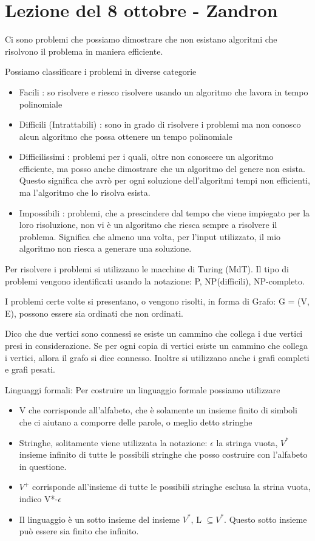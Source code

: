 \section{Lezione del 8 ottobre - Zandron}


Ci sono problemi che possiamo dimostrare che non esistano algoritmi che risolvono il problema in maniera efficiente. 

Possiamo classificare i problemi in diverse categorie
\begin{itemize}
    \item Facili : so risolvere e riesco risolvere usando un algoritmo che lavora in tempo polinomiale
    \item Difficili (Intrattabili) : sono in grado di risolvere i problemi ma non conosco alcun algoritmo che possa ottenere un tempo polinomiale
    \item Difficilissimi : problemi per i quali, oltre non conoscere un algoritmo efficiente, ma posso anche dimostrare che un algoritmo del genere non esista. Questo significa che avrò per ogni soluzione dell'algoritmi tempi non efficienti, ma l'algoritmo che lo risolva esista.
    \item Impossibili : problemi, che a prescindere dal tempo che viene impiegato per la loro risoluzione, non vi è un algoritmo che riesca sempre a risolvere il problema. Significa che almeno una volta, per l'input utilizzato, il mio algoritmo non riesca a generare una soluzione.
\end{itemize}

Per risolvere i problemi si utilizzano le macchine di Turing (MdT). Il tipo di problemi vengono identificati usando la notazione: P, NP(difficili), NP-completo.

I problemi certe volte si presentano, o vengono risolti, in forma di Grafo: G = (V, E), possono essere sia ordinati che non ordinati.

Dico che due vertici sono connessi se esiste un cammino che collega i due vertici presi in considerazione. Se per ogni copia di vertici esiste un cammino che collega i vertici, allora il grafo si dice connesso. Inoltre si utilizzano anche i grafi completi e grafi pesati.

Linguaggi formali: Per costruire un linguaggio formale possiamo utilizzare 
\begin{itemize}
    \item V che corrisponde all'alfabeto, che è solamente un insieme finito di simboli che ci aiutano a comporre delle parole, o meglio detto stringhe
    \item Stringhe, solitamente viene utilizzata la notazione: $\epsilon$ la stringa vuota, $V^*$ insieme infinito di tutte le possibili stringhe che posso costruire con l'alfabeto in questione.
    \item $V^+$ corrisponde all'insieme di tutte le possibili stringhe esclusa la strina vuota, indico V*-$\epsilon$
    \item Il linguaggio è un sotto insieme del insieme $V^*$, L $\subseteq V^*$. Questo sotto insieme può essere sia finito che infinito.
\end{itemize}

